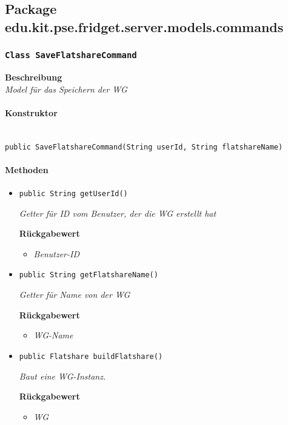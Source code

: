      \subsection{Package edu.kit.pse.fridget.server.models.commands}
     \subsubsection{\texttt{Class SaveFlatshareCommand}}
     \textbf{Beschreibung} \\
     \textit{Model für das Speichern der WG}
     \paragraph*{Konstruktor}\mbox{} \\
     \texttt{public SaveFlatshareCommand(String userId, String flatshareName)} 
     \paragraph*{Methoden}
     \begin{itemize}
     	\item{\texttt{public String getUserId()}}
     	
     	\textit{Getter für ID vom Benutzer, der die WG erstellt hat}
     	
     	\textbf{Rückgabewert}
     	\begin{itemize}
     		\item\textit{Benutzer-ID}
     	\end{itemize}
     
     \item{\texttt{public String getFlatshareName()}}
     	
     	\textit{Getter für Name von der WG}
     	
     	\textbf{Rückgabewert}
     	\begin{itemize}
     		\item\textit{WG-Name}
     	\end{itemize}
     
     \item{\texttt{public Flatshare buildFlatshare()}}
     	
     	\textit{Baut eine WG-Instanz.}
     	
     	\textbf{Rückgabewert}
     	\begin{itemize}
     		\item\textit{WG}
     	\end{itemize}
     \end{itemize}
 
